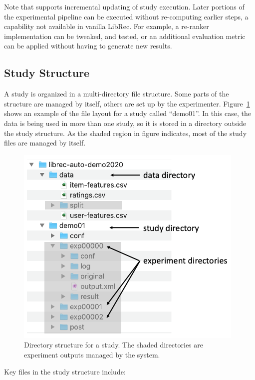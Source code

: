 Note that \libauto{} supports incremental updating of study execution. Later portions of the experimental pipeline can be executed without re-computing earlier steps, a capability not available in vanilla LibRec. For example, a re-ranker implementation can be tweaked, and tested, or an additional evaluation metric can be applied without having to generate new results.

\subsection{Study Structure}
\label{subsec:study_structure}
A study is organized in a multi-directory file structure. Some parts of the structure are managed by \libauto{} itself, others are set up by the experimenter. Figure~\ref{fig:study-dir} shows an example of the file layout for a study called ``demo01''. In this case, the data is being used in more than one study, so it is stored in a directory outside the study structure. As the shaded region in figure indicates, most of the study files are managed by \libauto{} itself. 

\begin{figure}[!htb]
    \centering
    \includegraphics[width=0.8\linewidth]{imgs/la/study-dir-labeled2.png}
    \caption{Directory structure for a \libauto{} study. The shaded directories are experiment outputs managed by the system.}
    \label{fig:study-dir}
    \vspace{-0.15in}
\end{figure}

Key files in the study structure include:

